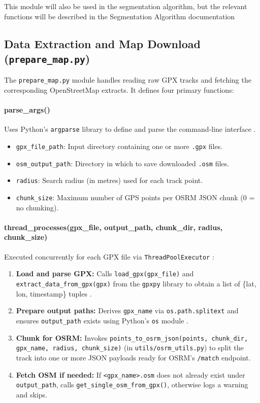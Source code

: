 \documentclass[11pt,a4paper]{article}
\begin{document}
\vspace{1ex}\noindent
This module will also be used in the segmentation algorithm, but the relevant functions will be described in the Segmentation Algorithm documentation

\subsection{Data Extraction and Map Download (\texttt{prepare\_map.py})}

The \texttt{prepare\_map.py} module handles reading raw GPX tracks and fetching the corresponding OpenStreetMap extracts.  It defines four primary functions:

\paragraph{parse\_args()}
Uses Python’s \texttt{argparse} library to define and parse the command‐line interface \citep{python-argparse-doc}.
\begin{itemize}
	\item \texttt{gpx\_file\_path}: Input directory containing one or more \texttt{.gpx} files.
	\item \texttt{osm\_output\_path}: Directory in which to save downloaded \texttt{.osm} files.
	\item \texttt{radius}: Search radius (in metres) used for each track point.
	\item \texttt{chunk\_size}: Maximum number of GPS points per OSRM JSON chunk (0 = no chunking).
\end{itemize}

\paragraph{thread\_processes(gpx\_file, output\_path, chunk\_dir, radius, chunk\_size)}
Executed concurrently for each GPX file via \texttt{ThreadPoolExecutor} \citep{python-concurrent-doc}:
\begin{enumerate}
	\item \textbf{Load and parse GPX:}
	      Calls \texttt{load\_gpx(gpx\_file)} and \texttt{extract\_data\_from\_gpx(gpx)} from the \texttt{gpxpy} library to obtain a list of \{lat, lon, timestamp\} tuples \citep{gpxpy}.
	\item \textbf{Prepare output paths:}
	      Derives \texttt{gpx\_name} via \texttt{os.path.splitext} and ensures \texttt{output\_path} exists using Python’s \texttt{os} module \citep{python-os-doc}.
	\item \textbf{Chunk for OSRM:}
	      Invokes \texttt{points\_to\_osrm\_json(points, chunk\_dir, gpx\_name, radius, chunk\_size)} (in \texttt{utils/osrm\_utils.py}) to split the track into one or more JSON payloads ready for OSRM’s \texttt{/match} endpoint.
	\item \textbf{Fetch OSM if needed:}
	      If \texttt{\textless gpx\_name\textgreater{}.osm} does not already exist under \texttt{output\_path}, calls \texttt{get\_single\_osm\_from\_gpx()}, otherwise logs a warning and skips.
\end{enumerate}
\end{document}
